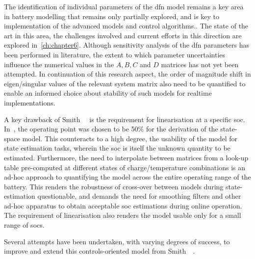 The identification of individual parameters of the \gls{dfn} model remains a key area in battery modelling that remains
only partially explored, and is key to implementation of the advanced models and control algorithms.. The state of the art in this area, the challenges involved and current efforts in
this direction are explored in~\cref{ch:chapter6}. Although sensitivity analysis of the \gls{dfn} parameters has been
performed in literature,  the extent to which parameter uncertainties influence the numerical values
in the $A, B, C$ and $D$ matrices has not yet been attempted. In continuation of this research aspect, the order of
magnitude shift in eigen/singular values of the relevant system matrix also need to be quantified to enable an informed
choice about stability of such models for realtime implementations.

A key drawback of Smith~\etal{}~\cite{Smith2007} is the requirement for linearisation at a specific \gls{soc}.
In~\cite{Smith2007}, the operating point was chosen to be 50\% for the derivation of the state-space model. This
counteracts to a high degree, the usability of the model for state estimation tasks, wherein the \gls{soc} is itself the
unknown quantity to be estimated. Furthermore, the need to interpolate between matrices from a look-up table
pre-computed at different states of charge/temperature combinations is an ad-hoc approach to quantifying the model
across the entire operating range of the battery. This renders the robustness of cross-over between models during
state-estimation questionable, and demands the need for smoothing filters and other ad-hoc apparatus to obtain
acceptable \gls{soc} estimations during online operation. The requirement of linearisation also renders the model usable
only for a small range of \gls{soc}s.

Several attempts have been undertaken, with varying degrees of success, to improve and extend this controls-oriented
model from Smith~\etal{}~\cite{Smith2007}.

